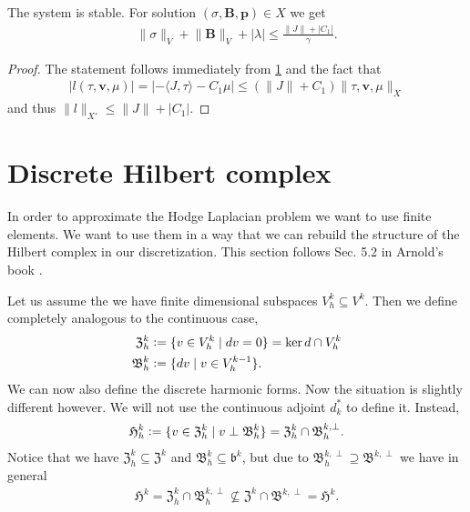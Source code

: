 \documentclass[../master_thesis.tex]{subfiles}
\begin{document}
\begin{theorem}[Stability]
    The system is stable. For solution $(\sigma, \mathbf{B},\mathbf{p}) \in X$
    we get 
    \begin{align*}
        \lVert \sigma \rVert _V + \lVert \mathbf{B} \rVert _V + |\lambda|
        \leq \frac{\lVert J \rVert + |C_1|}{\gamma}.
    \end{align*}
\end{theorem}
\begin{proof}
    The statement follows immediately from \ref{} and the fact that 
    \begin{align*}
        | l(\tau,\mathbf{v},\mu) |
        = | - \langle J, \tau \rangle - C_1 \mu | 
        \leq (\lVert J \rVert + C_1) \lVert \tau,\mathbf{v},\mu \rVert _X
    \end{align*}
    and thus $\lVert l \rVert _{X'} \leq \lVert J \rVert + | C_1 |$.
\end{proof}

\section{Discrete Hilbert complex}

In order to approximate the Hodge Laplacian problem we want to use finite elements.
We want to use them in a way that we can rebuild the structure of the Hilbert complex 
in our discretization. This section follows Sec. 5.2 in Arnold's book \cite{arnold}.

Let us assume the we have finite dimensional subspaces $V_h^k \subseteq V^k$. 
Then we define completely analogous to the continuous case,
\begin{align*}
    \mathfrak{Z}_h^k &\vcentcolon= \{ v \in V_h^k \mid d v = 0 \} = \ker d \cap V^k_h
    \\ \mathfrak{B}^k_h &\vcentcolon= \{ dv \mid v \in V_h^{k-1} \}.
\end{align*}
We can now also define the discrete harmonic forms. Now the situation is slightly 
different however. We will not use the continuous adjoint $d^*_k$ to define it.
Instead,
\begin{align*}
    \mathfrak{H}_h^k \vcentcolon= \{ v \in \mathfrak{Z}_h^k \mid v \perp \mathfrak{B}^k_h \}
        = \mathfrak{Z}_h^k \cap \mathfrak{B}_h^{k,\perp}.
\end{align*}
Notice that we have $\mathfrak{Z}_h^k \subseteq \mathfrak{Z}^k$ and 
$\mathfrak{B}_h^k \subseteq \mathfrak{b}^k$, but due to 
$\mathfrak{B}_h^{k,\perp} \supseteq \mathfrak{B}^{k,\perp}$ we have in general
\begin{align*}
    \mathfrak{H}^k = \mathfrak{Z}_h^k \cap \mathfrak{B}_h^{k,\perp} 
    \not\subseteq    \mathfrak{Z}^k \cap \mathfrak{B}^{k,\perp} = \mathfrak{H}^k.
\end{align*}
\end{document}

